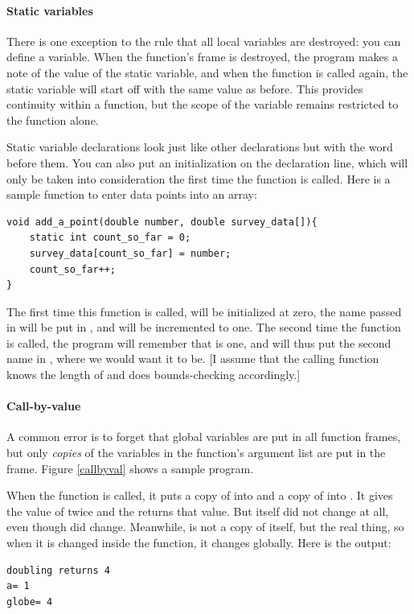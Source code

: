 \documentclass[12pt]{article}
\makeatletter
\def\cind#1{\index{#1@\cinline{#1}}\cinline{#1}}
\makeatother
\begin{document}
\paragraph{\treesymbol Static variables} There is one exception to the rule that
all local variables are destroyed: you can define a 
variable. When the function's frame is destroyed, the program makes a
note of the value of the  static variable, and when the function is called
again, the static variable will start off with the same value
as before. This provides continuity within a function, but the scope
of the variable remains restricted to the function alone.

Static variable declarations look just like other declarations but with
the word \cind{static} before them. You can also put an initialization on
the declaration line, which will only be taken into consideration the
first time the function is called. Here is a sample function to enter 
data points into an array:
\begin{lstlisting}
void add_a_point(double number, double survey_data[]){
    static int count_so_far = 0;
    survey_data[count_so_far] = number;
    count_so_far++;
}
\end{lstlisting}

The first time this function is called, 
will be initialized at zero, the name passed in will be put in
, and  will be
incremented to one. The second time the function is called, the program
will remember that  is one, and will thus put the
second name in , where we would want it to be.
[I assume that the calling function knows the length of
 and does bounds-checking accordingly.]

\paragraph{Call-by-value} 
A common error is to forget that global variables are put in all function
frames, but only {\sl copies} of the variables in the function's argument
list are put in the frame.  Figure \ref{callbyval} shows a sample program.


When the  function is called, it puts a copy of  into  and a copy of 
into . It gives  the value of twice  and the returns that value. But 
itself did not change at all, even though  did change. Meanwhile,  is not a copy of
itself, but the real thing, so when it is changed inside the function, it changes globally.
Here is the output:
\begin{lstlisting}
doubling returns 4
a= 1
globe= 4
\end{lstlisting}
\end{document}

